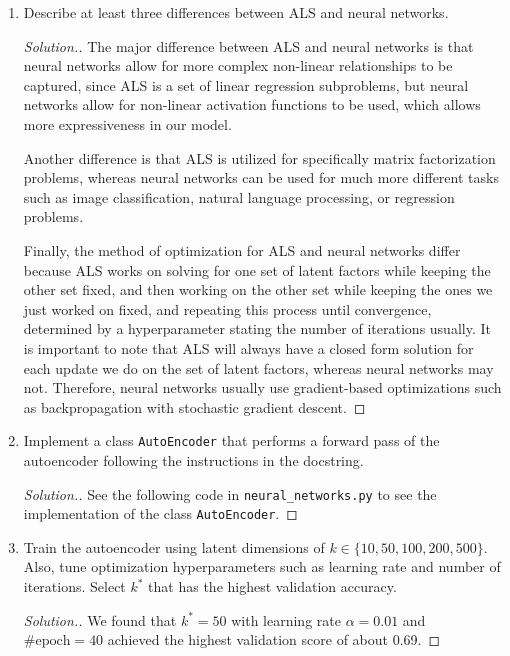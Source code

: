 \documentclass[11pt]{article}
\begin{document}
\begin{enumerate}

\item[(a)] Describe at least three differences between ALS and neural networks.

\begin{proof}[Solution.]
    The major difference between ALS and neural networks is that neural networks allow for more complex non-linear relationships to be captured,
    since ALS is a set of linear regression subproblems, but neural networks allow for non-linear activation functions to be used, which allows more expressiveness in our model.

    Another difference is that ALS is utilized for specifically matrix factorization problems, whereas neural networks can be used for much more different tasks such as image classification, natural language processing, or regression problems.

    Finally, the method of optimization for ALS and neural networks differ because ALS works on solving for one set of latent factors while keeping the other set fixed, and then working on the other set while keeping the ones we just worked on fixed, and repeating this process until convergence, determined by a hyperparameter stating the number of iterations usually.
    It is important to note that ALS will always have a closed form solution for each update we do on the set of latent factors, whereas neural networks may not. Therefore, neural networks usually use gradient-based optimizations such as backpropagation with stochastic gradient descent.
\end{proof}

\item[(b)] Implement a class \verb|AutoEncoder| that performs a forward pass of the autoencoder following the instructions in the docstring.

\begin{proof}[Solution.]
    See the following code in \verb|neural_networks.py| to see the implementation of the class \verb|AutoEncoder|.
\end{proof}

\item[(c)] Train the autoencoder using latent dimensions of $k \in \{10,50,100,200,500\}$. Also, tune optimization hyperparameters such as learning rate and number of iterations. Select $k^*$ that has the highest validation accuracy.

\begin{proof}[Solution.]
We found that $k^* = 50$ with learning rate $\alpha = 0.01$ and $\#\text{epoch} = 40$ achieved the highest validation score of about 0.69.
\end{proof}


\end{enumerate}
\end{document}
